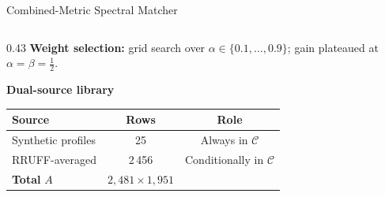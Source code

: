 \documentclass[aspectratio=169,10pt]{beamer}
\begin{document}
\begin{frame}{Combined-Metric Spectral Matcher}
\begin{columns}[T]
\begin{column}{0.43\textwidth}
      \vspace{0.12cm}
      {\small\bfseries\color{headerbg}Weight selection:}
      \footnotesize grid search over
      $\alpha\in\{0.1,\ldots,0.9\}$; gain plateaued
      at $\alpha{=}\beta{=}\tfrac{1}{2}$.

      \vspace{0.12cm}
      {\small\bfseries\color{headerbg}Dual-source library}

      \vspace{0.04cm}
      \scriptsize
      \begin{tabular}{@{}lcc@{}}
        \toprule
        \textbf{Source} & \textbf{Rows} & \textbf{Role}\\
        \midrule
        Synthetic profiles & 25 & Always in $\mathcal{C}$\\
        RRUFF-averaged & 2\,456 & Conditionally in $\mathcal{C}$\\
        \midrule
        \textbf{Total} $A$ & $2{,}481\times1{,}951$ &\\
        \bottomrule
      \end{tabular}
    \end{column}
  \end{columns}
\end{frame}
\end{document}
